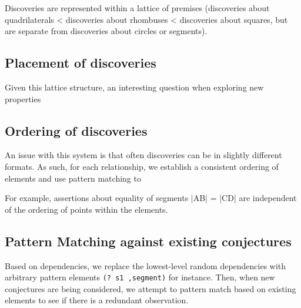 Discoveries are represented within a lattice of premises (discoveries
about quadrilaterals < discoveries about rhombuses < discoveries about
squares, but are separate from discoveries about circles or segments).

\subsection{Placement of discoveries}

Given this lattice structure, an interesting question when exploring
new properties

\subsection{Ordering of discoveries}

An issue with this system is that often discoveries can be in slightly
different formats. As such, for each relationship, we establish a
consistent ordering of elements and use pattern matching to

For example, assertions about equality of segments |AB| = |CD| are
independent of the ordering of points within the elements.

\subsection{Pattern Matching against existing conjectures}

Based on dependencies, we replace the lowest-level random dependencies
with arbitrary pattern elements \texttt{(? s1 ,segment)} for
instance. Then, when new conjectures are being considered, we attempt
to pattern match based on existing elements to see if there is a
redundant observation.
